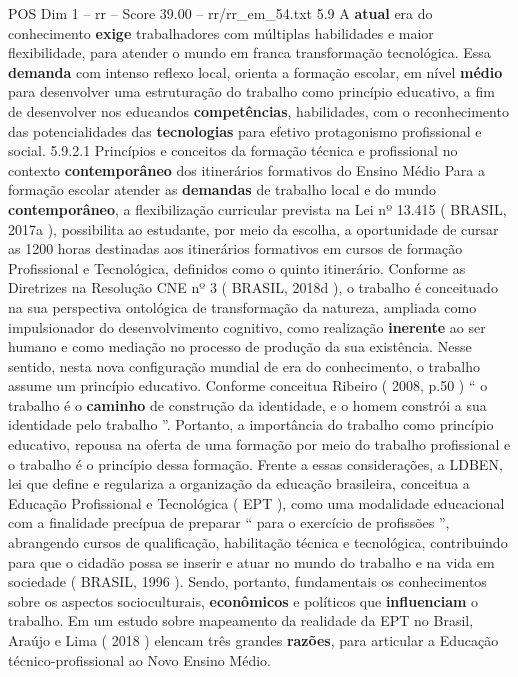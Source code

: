 \begin{textsample}{POS Dim 1 – rr – Score 39.00 – rr/rr\_em\_54.txt}  \label{ex:f1_pos_220}
5.9 A \textbf{atual} era do conhecimento \textbf{exige} trabalhadores com múltiplas habilidades e maior flexibilidade, para atender o mundo em franca transformação tecnológica.
Essa \textbf{demanda} com intenso reflexo local, orienta a formação escolar, em nível \textbf{médio} para desenvolver uma estruturação do trabalho como princípio educativo, a fim de desenvolver nos educandos \textbf{competências}, habilidades, com o reconhecimento das potencialidades das \textbf{tecnologias} para efetivo protagonismo profissional e social. 5.9.2.1 Princípios e conceitos da formação técnica e profissional no contexto \textbf{contemporâneo} dos itinerários formativos do Ensino Médio Para a formação escolar atender as \textbf{demandas} de trabalho local e do mundo \textbf{contemporâneo}, a flexibilização curricular prevista na Lei nº 13.415 ( BRASIL, 2017a ), possibilita ao estudante, por meio da escolha, a oportunidade de cursar as 1200 horas destinadas aos itinerários formativos em cursos de formação Profissional e Tecnológica, definidos como o quinto itinerário.
Conforme as Diretrizes na Resolução CNE nº 3 ( BRASIL, 2018d ), o trabalho é conceituado na sua perspectiva ontológica de transformação da natureza, ampliada como impulsionador do desenvolvimento cognitivo, como realização \textbf{inerente} ao ser humano e como mediação no processo de produção da sua existência.
Nesse sentido, nesta nova configuração mundial de era do conhecimento, o trabalho assume um princípio educativo.
Conforme conceitua Ribeiro ( 2008, p.50 ) “ o trabalho é o \textbf{caminho} de construção da identidade, e o homem constrói a sua identidade pelo trabalho ”.
Portanto, a importância do trabalho como princípio educativo, repousa na oferta de uma formação por meio do trabalho profissional e o trabalho é o princípio dessa formação.
Frente a essas considerações, a LDBEN, lei que define e regulariza a organização da educação brasileira, conceitua a Educação Profissional e Tecnológica ( EPT ), como uma modalidade educacional com a finalidade precípua de preparar “ para o exercício de profissões ”, abrangendo cursos de qualificação, habilitação técnica e tecnológica, contribuindo para que o cidadão possa se inserir e atuar no mundo do trabalho e na vida em sociedade ( BRASIL, 1996 ).
Sendo, portanto, fundamentais os conhecimentos sobre os aspectos socioculturais, \textbf{econômicos} e políticos que \textbf{influenciam} o trabalho.
Em um estudo sobre mapeamento da realidade da EPT no Brasil, Araújo e Lima ( 2018 ) elencam três grandes \textbf{razões}, para articular a Educação técnico-profissional ao Novo Ensino Médio.

\end{textsample}
